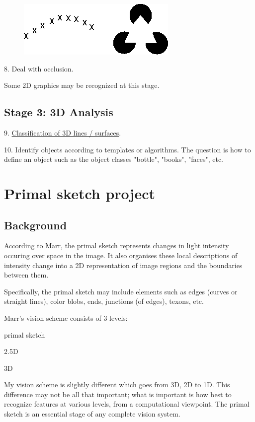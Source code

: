 \begin{figure}[H]
\centering
\includegraphics[scale=0.6]{GestaltContours.PNG}
\end{figure}

8. Deal with occlusion.

Some 2D graphics may be recognized at this stage.

\subsection{Stage 3: 3D Analysis}

9. \href{Vis-3DTaxonomy.htm}{Classification of 3D lines / surfaces}.

10. Identify objects according to templates or algorithms. The question is how to define an object such as the object classes "bottle", "books", "faces", etc.

\section{Primal sketch project}

\subsection{Background}

According to Marr, the primal sketch represents changes in light intensity occuring over space in the image. It also organises these local descriptions of intensity change into a 2D representation of image regions and the boundaries between them.

Specifically, the primal sketch may include elements such as edges (curves or straight lines), color blobs, ends, junctions (of edges), texons, etc.

Marr's vision scheme consists of 3 levels:
\begin{compactenum}
	\item primal sketch
	\item 2.5D
	\item 3D
\end{compactenum}

My \href{Vis-BasicScheme.htm}{vision scheme} is slightly different which goes from 3D, 2D to 1D. This difference may not be all that important; what is important is how best to recognize features at various levels, from a computational viewpoint. The primal sketch is an essential stage of any complete vision system.

